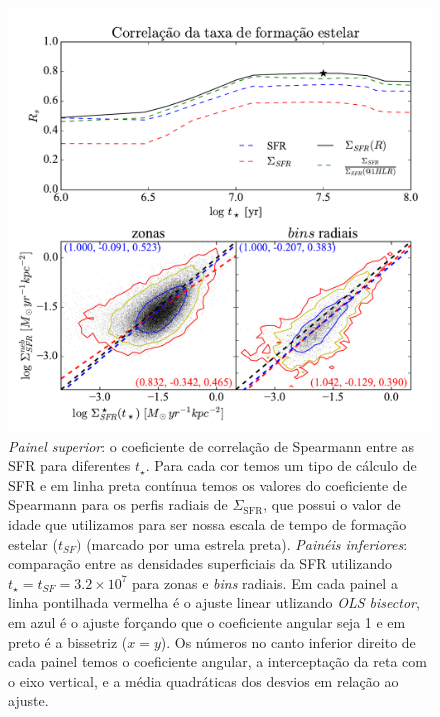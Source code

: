 \begin{figure}
	\centering
	\includegraphics[scale=0.7, clip]{figuras/Rs_allSFR.pdf}
	\caption[Comparação entre as SFR.]
	{\emph{Painel superior}: o coeficiente de correlação de Spearmann entre as SFR para diferentes
$t_\star$. Para cada cor temos um tipo de cálculo de SFR e em linha preta contínua temos os valores
do coeficiente de Spearmann para os perfis radiais de $\Sigma_{\mathrm{SFR}}$, que possui o valor de
idade que utilizamos para ser nossa escala de tempo de formação estelar ($t_{SF})$ (marcado
por uma estrela preta). \emph{Painéis inferiores}: comparação entre as densidades superficiais da
SFR utilizando $t_\star = t_{SF} = 3.2 \times 10^7$ para zonas e {\em bins} radiais. Em cada painel
a linha pontilhada vermelha é o ajuste linear utlizando {\em OLS bisector}, em azul é o ajuste
forçando que o coeficiente angular seja 1 e em preto é a bissetriz ($x = y$). Os números no canto
inferior direito de cada painel temos o coeficiente angular, a interceptação da reta com o eixo
vertical, e a média quadráticas dos desvios em relação ao ajuste.}
	\label{fig:SFRsynvsneb}
\end{figure}

